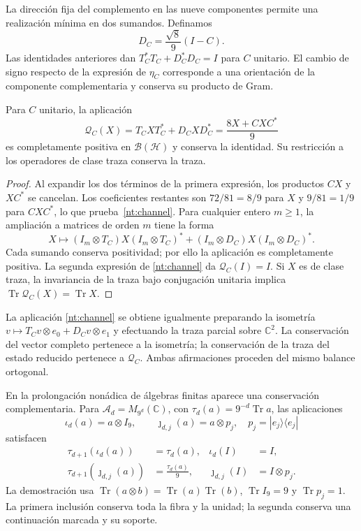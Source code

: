 La dirección fija del complemento en las nueve componentes
permite una realización mínima en dos sumandos. Definamos
\[
 D_C=\frac{\sqrt8}{9}(I-C).
\]
Las identidades anteriores dan
\(T_C^*T_C+D_C^*D_C=I\) para \(C\) unitario.
El cambio de signo respecto de la expresión de
\(\eta_C\) corresponde a una orientación de la componente
complementaria y conserva su producto de Gram.

\begin{proposition}
Para \(C\) unitario, la aplicación
\begin{equation}
 \mathcal Q_C(X)=T_CXT_C^*+D_CXD_C^*
              =\frac{8X+CXC^*}{9}
 \label{nt:channel}
\end{equation}
es completamente positiva en \(\mathcal B(\mathcal H)\) y
conserva la identidad. Su restricción a los operadores de
clase traza conserva la traza.
\end{proposition}

\begin{proof}
Al expandir los dos términos de la primera expresión,
los productos \(CX\) y \(XC^*\) se cancelan. Los coeficientes
restantes son \(72/81=8/9\) para \(X\) y \(9/81=1/9\)
para \(CXC^*\), lo que prueba~\eqref{nt:channel}.
Para cualquier entero \(m\geq1\), la ampliación a matrices
de orden \(m\) tiene la forma
\[
 X\longmapsto
 (I_m\otimes T_C)X(I_m\otimes T_C)^*
 +(I_m\otimes D_C)X(I_m\otimes D_C)^*.
\]
Cada sumando conserva positividad; por ello la aplicación es
completamente positiva. La segunda expresión de
\eqref{nt:channel} da \(\mathcal Q_C(I)=I\).
Si \(X\) es de clase traza, la invariancia de la traza bajo
conjugación unitaria implica
\(\operatorname{Tr}\mathcal Q_C(X)=\operatorname{Tr}X\).
\end{proof}

La aplicación \eqref{nt:channel} se obtiene igualmente
preparando la isometría
\(v\mapsto T_Cv\otimes e_0+D_Cv\otimes e_1\) y efectuando
la traza parcial sobre \(\mathbb C^2\).
La conservación del vector completo pertenece a la isometría;
la conservación de la traza del estado reducido pertenece a
\(\mathcal Q_C\). Ambas afirmaciones proceden del mismo
balance ortogonal.

En la prolongación nonádica de álgebras finitas aparece una
conservación complementaria. Para
\(\mathcal A_d=M_{9^d}(\mathbb C)\), con
\(\tau_d(a)=9^{-d}\operatorname{Tr}a\), las aplicaciones
\[
 \iota_d(a)=a\otimes I_9,\qquad
 \jmath_{d,j}(a)=a\otimes p_j,
 \quad p_j=|e_j\rangle\langle e_j|
\]
satisfacen
\begin{align}
 \tau_{d+1}(\iota_d(a))&=\tau_d(a),
 &\iota_d(I)&=I,\label{nt:unital-trace}\\
 \tau_{d+1}(\jmath_{d,j}(a))&=\frac{\tau_d(a)}9,
 &\jmath_{d,j}(I)&=I\otimes p_j.\label{nt:corner-trace}
\end{align}
La demostración usa
\(\operatorname{Tr}(a\otimes b)=
\operatorname{Tr}(a)\operatorname{Tr}(b)\),
\(\operatorname{Tr}I_9=9\) y \(\operatorname{Tr}p_j=1\).
La primera inclusión conserva toda la fibra y la unidad;
la segunda conserva una continuación marcada y su soporte.

